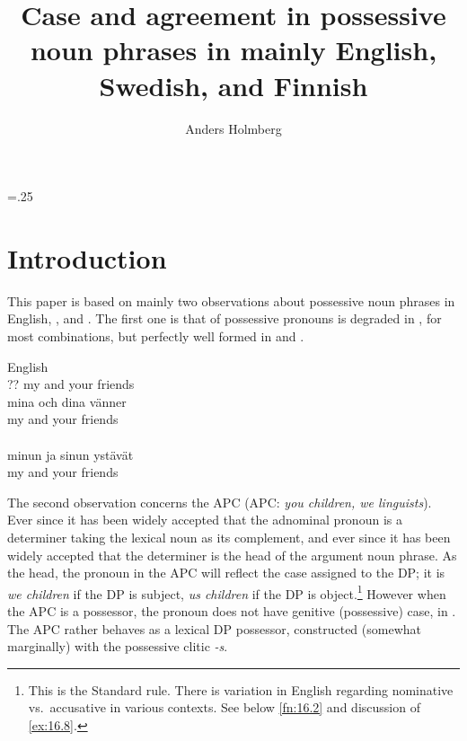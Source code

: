 \documentclass[output=paper]{langsci/langscibook}
\author{Anders Holmberg\affiliation{University of Newcastle}}
\title{Case and agreement in possessive noun phrases in mainly English, Swedish,
and Finnish}
\begin{document}
\glsresetall
\maketitle
\multicolsep=.25\baselineskip


\section{Introduction}\label{sec:16.1}

This paper is based on mainly two observations about possessive noun phrases in
English, , and . The first one is that  of possessive
pronouns is degraded in , for most combinations, but perfectly well
formed in  and .\newpage

\ea\label{ex:16.1}
	\ea English\\
    ?? my and your friends
	\ex {}\\
		\gll mina och dina vänner\\
        my    and your friends\\
    \ex {}\\
		\gll minun ja  sinun ystävät\\
        my and your friends\\
	\z
\z

The second observation concerns the \glsdesc{APC}
(\gls{APC}:
\emph{you children, we linguists}). Ever since \textcite{Postal1969} it has been widely
accepted that the adnominal pronoun is a determiner taking the lexical noun as
its complement, and ever since \citet{Abney1987} it has been widely accepted
that the determiner is the head of the argument noun phrase.  As the head, the
pronoun in the \gls{APC} will reflect the case assigned to the DP; it is
\emph{we children} if the DP is subject, \emph{us children} if the DP is
object.\footnote{ This is the Standard  rule. There is variation in
English regarding nominative vs.\ accusative in various
contexts. See below \cref{fn:16.2} and discussion of \eqref{ex:16.8}.} However when the
\gls{APC} is a possessor, the pronoun does not have genitive (possessive) case,
in . The \gls{APC} rather behaves as a lexical DP possessor, constructed
(somewhat marginally) with the possessive clitic \emph{-s}.
\end{document}
